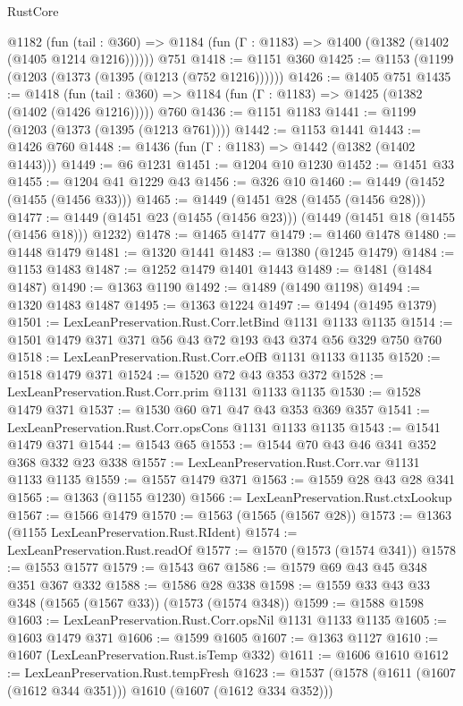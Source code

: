 \begin{lexlean}{RustCore}
\begin{coremodule}
    @1182
      (fun (tail : @360) => @1184 (fun (Γ : @1183) => @1400 (@1382 (@1402 (@1405 @1214 @1216))))))
    @751
@1418 := @1151 @360
@1425 := @1153 (@1199 (@1203 (@1373 (@1395 (@1213 (@752 @1216))))))
@1426 := @1405 @751
@1435 := @1418
    (fun (tail : @360) => @1184 (fun (Γ : @1183) => @1425 (@1382 (@1402 (@1426 @1216)))))
    @760
@1436 := @1151 @1183
@1441 := @1199 (@1203 (@1373 (@1395 (@1213 @761))))
@1442 := @1153 @1441
@1443 := @1426 @760
@1448 := @1436 (fun (Γ : @1183) => @1442 (@1382 (@1402 @1443)))
@1449 := @6 @1231
@1451 := @1204 @10 @1230
@1452 := @1451 @33
@1455 := @1204 @41 @1229 @43
@1456 := @326 @10
@1460 := @1449 (@1452 (@1455 (@1456 @33)))
@1465 := @1449 (@1451 @28 (@1455 (@1456 @28)))
@1477 := @1449 (@1451 @23 (@1455 (@1456 @23))) (@1449 (@1451 @18 (@1455 (@1456 @18))) @1232)
@1478 := @1465 @1477
@1479 := @1460 @1478
@1480 := @1448 @1479
@1481 := @1320 @1441
@1483 := @1380 (@1245 @1479)
@1484 := @1153 @1483
@1487 := @1252 @1479 @1401 @1443
@1489 := @1481 (@1484 @1487)
@1490 := @1363 @1190
@1492 := @1489 (@1490 @1198)
@1494 := @1320 @1483 @1487
@1495 := @1363 @1224
@1497 := @1494 (@1495 @1379)
@1501 := LexLeanPreservation.Rust.Corr.letBind @1131 @1133 @1135
@1514 := @1501 @1479 @371 @371 @56 @43 @72 @193 @43 @374 @56 @329 @750 @760
@1518 := LexLeanPreservation.Rust.Corr.eOfB @1131 @1133 @1135
@1520 := @1518 @1479 @371
@1524 := @1520 @72 @43 @353 @372
@1528 := LexLeanPreservation.Rust.Corr.prim @1131 @1133 @1135
@1530 := @1528 @1479 @371
@1537 := @1530 @60 @71 @47 @43 @353 @369 @357
@1541 := LexLeanPreservation.Rust.Corr.opsCons @1131 @1133 @1135
@1543 := @1541 @1479 @371
@1544 := @1543 @65
@1553 := @1544 @70 @43 @46 @341 @352 @368 @332 @23 @338
@1557 := LexLeanPreservation.Rust.Corr.var @1131 @1133 @1135
@1559 := @1557 @1479 @371
@1563 := @1559 @28 @43 @28 @341
@1565 := @1363 (@1155 @1230)
@1566 := LexLeanPreservation.Rust.ctxLookup
@1567 := @1566 @1479
@1570 := @1563 (@1565 (@1567 @28))
@1573 := @1363 (@1155 LexLeanPreservation.Rust.RIdent)
@1574 := LexLeanPreservation.Rust.readOf
@1577 := @1570 (@1573 (@1574 @341))
@1578 := @1553 @1577
@1579 := @1543 @67
@1586 := @1579 @69 @43 @45 @348 @351 @367 @332
@1588 := @1586 @28 @338
@1598 := @1559 @33 @43 @33 @348 (@1565 (@1567 @33)) (@1573 (@1574 @348))
@1599 := @1588 @1598
@1603 := LexLeanPreservation.Rust.Corr.opsNil @1131 @1133 @1135
@1605 := @1603 @1479 @371
@1606 := @1599 @1605
@1607 := @1363 @1127
@1610 := @1607 (LexLeanPreservation.Rust.isTemp @332)
@1611 := @1606 @1610
@1612 := LexLeanPreservation.Rust.tempFresh
@1623 := @1537 (@1578 (@1611 (@1607 (@1612 @344 @351))) @1610 (@1607 (@1612 @334 @352)))

\end{coremodule}
\end{lexlean}

